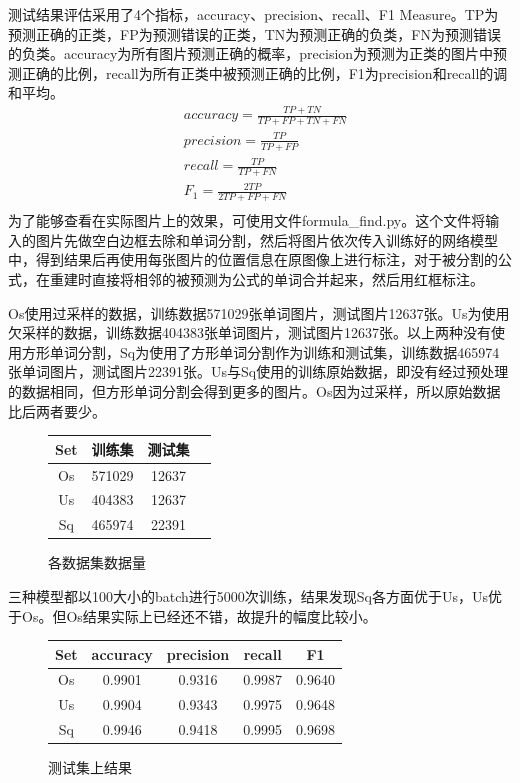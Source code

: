 测试结果评估采用了4个指标，accuracy、precision、recall、F1 Measure。TP为预测正确的正类，FP为预测错误的正类，TN为预测正确的负类，FN为预测错误的负类。accuracy为所有图片预测正确的概率，precision为预测为正类的图片中预测正确的比例，recall为所有正类中被预测正确的比例，F1为precision和recall的调和平均。
\begin{align}
    &accuracy = \frac {TP + TN} {TP + FP + TN + FN} \\
    &precision = \frac {TP} {TP + FP} \\
    &recall = \frac {TP} {TP + FN} \\
    &F_1 = \frac {2 TP } {2 TP + FP + FN} \\
\end{align}
为了能够查看在实际图片上的效果，可使用文件formula\_find.py。这个文件将输入的图片先做空白边框去除和单词分割，然后将图片依次传入训练好的网络模型中，得到结果后再使用每张图片的位置信息在原图像上进行标注，对于被分割的公式，在重建时直接将相邻的被预测为公式的单词合并起来，然后用红框标注。

Os使用过采样的数据，训练数据571029张单词图片，测试图片12637张。Us为使用欠采样的数据，训练数据404383张单词图片，测试图片12637张。以上两种没有使用方形单词分割，Sq为使用了方形单词分割作为训练和测试集，训练数据465974张单词图片，测试图片22391张。Us与Sq使用的训练原始数据，即没有经过预处理的数据相同，但方形单词分割会得到更多的图片。Os因为过采样，所以原始数据比后两者要少。
\begin{figure}[hp]
    \centering
    \begin{tabular}{cccc}
    \toprule
    Set& 训练集& 测试集\\
    \midrule
    Os& 571029& 12637\\
    Us& 404383& 12637\\
    Sq& 465974& 22391\\
    \bottomrule
    \end{tabular}
    \caption{各数据集数据量}
\end{figure}
三种模型都以100大小的batch进行5000次训练，结果发现Sq各方面优于Us，Us优于Os。但Os结果实际上已经还不错，故提升的幅度比较小。
\begin{figure}[hp]
\centering
\begin{tabular}{ccccc}
\toprule
Set& accuracy& precision& recall& F1\\
\midrule
Os& 0.9901& 0.9316& 0.9987& 0.9640\\
Us& 0.9904& 0.9343& 0.9975& 0.9648\\
Sq& 0.9946& 0.9418& 0.9995& 0.9698\\
\bottomrule
\end{tabular}
\caption{测试集上结果}
\end{figure}

